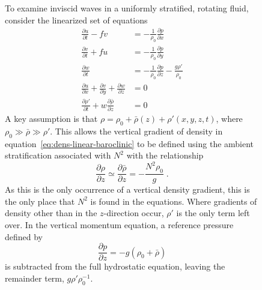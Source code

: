 \documentclass[11pt]{report}
\numberwithin{equation}{section}
\begin{document}
\begin{figure}
To examine inviscid waves in a uniformly stratified, rotating fluid, consider the linearized set of equations
\begin{align}
    \frac{\partial u}{\partial t} - fv 
        &= -\frac{1}{\rho_0}\frac{\partial p}{\partial x} \label{eq:u-linear-baroclinic} \\
    \frac{\partial v}{\partial t} + fu 
        &= -\frac{1}{\rho_0}\frac{\partial p}{\partial y} \label{eq:v-linear-baroclinic} \\
    \frac{\partial w}{\partial t}  
                &= -\frac{1}{\rho_0}\frac{\partial p}{\partial z} 
                   -\frac{g \rho'}{\rho_0} \label{eq:w-linear-baroclinic} \\
    \frac{\partial u}{\partial x} 
        + \frac{\partial v}{\partial y} 
        + \frac{\partial w}{\partial z} 
                &= 0 \label{eq:cont-linear-baroclinic}\\
    \frac{\partial \rho'}{\partial t} + w\frac{\partial \bar{\rho}}{\partial z}
                &= 0 \label{eq:dens-linear-baroclinic}
\end{align}
A key assumption is that $\rho = \rho_0 + \bar{\rho}(z) + \rho'(x, y, z, t)$, where $\rho_0 \gg \bar{\rho} \gg \rho'$.  This allows the vertical gradient of density in equation~\ref{eq:dens-linear-baroclinic} to be defined using the ambient stratification associated with $N^2$ with the relationship
\begin{equation}
    \frac{\partial \rho}{\partial z} \simeq \frac{\partial \bar{\rho}}{\partial z} = -\frac{N^2 \rho_0}{g} \; .
\end{equation}
As this is the only occurrence of a vertical density gradient, this is the only place that $N^2$ is found in the equations.  Where gradients of density other than in the $z$-direction occur, $\rho'$ is the only term left over.  In the vertical momentum equation, a reference pressure defined by
\begin{equation}
    \frac{\partial p}{\partial z} = -g (\rho_0 + \bar{\rho})
\end{equation}
is subtracted from the full hydrostatic equation, leaving the remainder term, $g \rho' \rho_0^{-1}$.


\end{figure}
\end{document}
